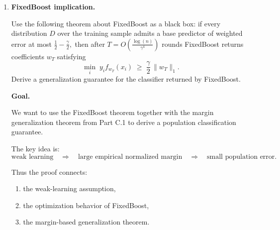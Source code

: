 \documentclass[11pt]{article}
\begin{document}
\begin{enumerate}
\begin{solutionbox}
Several important conclusions follow:

\begin{itemize}
    \item Larger margins improve generalization because the bound scales like
    \[
    \frac1\gamma.
    \]

    \item Dependence on the number of base predictors is only logarithmic:
    \[
    \log|\mathcal G|.
    \]

    \item The theorem explains why boosting algorithms often generalize well even after achieving zero training error:
    the margin may continue improving after interpolation.
\end{itemize}

Conceptually, the theorem says:
\[
\text{large normalized margins}
\quad\Longrightarrow\quad
\text{small population error}.
\]

This is one of the foundational theoretical explanations for the success of boosting methods.

\end{solutionbox}

\item \textbf{ FixedBoost implication.}

Use the following theorem about FixedBoost as a black box: if every distribution $D$ over 
the training sample admits a base predictor of weighted error at most 
$
\frac{1}{2} - \frac{\gamma}{2},
$
then after 
$
T = O\!\left( \frac{\log(n)}{\gamma^{4}} \right)
$
rounds FixedBoost returns coefficients $w_T$ satisfying
$$
\min_i \; y_i f_{w_T}(x_i) 
\;\ge\; 
\frac{\gamma}{2} \, \|w_T\|_1 .
$$
Derive a generalization guarantee for the classifier returned by FixedBoost.

\begin{solutionbox}
\textbf{Goal.}

We want to use the FixedBoost theorem together with the margin generalization theorem from Part C.1 to derive a population classification guarantee.

The key idea is:
\[
\text{weak learning}
\quad\Longrightarrow\quad
\text{large empirical normalized margin}
\quad\Longrightarrow\quad
\text{small population error}.
\]

Thus the proof connects:
\begin{enumerate}
    \item the weak-learning assumption,
    \item the optimization behavior of FixedBoost,
    \item the margin-based generalization theorem.
\end{enumerate}


\end{solutionbox}
\end{enumerate}
\end{document}
